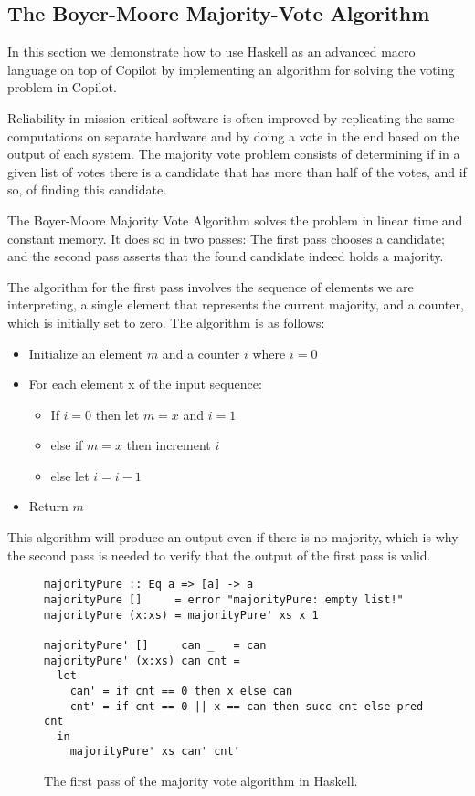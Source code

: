 \subsection{The Boyer-Moore Majority-Vote Algorithm}
\label{subsec:boyer_moore}

In this section we demonstrate how to use Haskell as an advanced macro language
on top of Copilot by implementing an algorithm for solving the voting problem
in Copilot.

Reliability in mission critical software is often improved by replicating
the same computations on separate hardware and by doing a vote in the end
based on the output of each system. The majority vote problem consists of
determining if in a given list of votes there is a candidate that has more
than half of the votes, and if so, of finding this candidate.

The Boyer-Moore Majority Vote Algorithm \cite{MooreBoyer82,Hesselink2005} solves
the problem in linear time and constant memory. It does so in two passes: The
first pass chooses a candidate; and the second pass asserts that the
found candidate indeed holds a majority.

The algorithm for the first pass involves the sequence of elements we are interpreting,
a single element that represents the current majority, and a counter,
which is initially set to zero. The algorithm is as follows:
\begin{itemize}
\item Initialize an element $m$ and a counter $i$ where $i=0$
\item For each element x of the input sequence: 
	\begin{itemize} 
	\item If $i=0$ then let $m=x$ and $i=1$
	\item else if $m=x$ then increment $i$
	\item else let $i = i-1$
	\end{itemize}
\item Return $m$
\end{itemize}

This algorithm will produce an output even if there is no majority, which is why 
the second pass is needed to verify that the output of the first pass is valid. 

\begin{figure*}[!htb]
\begin{lstlisting}[language = Copilot, frame = none]
majorityPure :: Eq a => [a] -> a
majorityPure []     = error "majorityPure: empty list!"
majorityPure (x:xs) = majorityPure' xs x 1

majorityPure' []     can _   = can
majorityPure' (x:xs) can cnt =
  let
    can' = if cnt == 0 then x else can
    cnt' = if cnt == 0 || x == can then succ cnt else pred cnt
  in
    majorityPure' xs can' cnt'
\end{lstlisting}
\caption{The first pass of the majority vote algorithm in Haskell.}
\label{fig:majority_pure}
\end{figure*}

